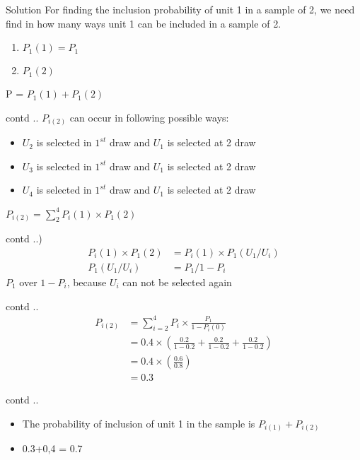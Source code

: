 \documentclass[10pt]{beamer}
\begin{document}
\begin{frame}{Solution}
For finding the inclusion probability of unit 1 in a sample of 2, we need find in how many ways unit 1 can be included in a sample of 2.
\begin{enumerate}
    \item $P_1(1) = P_1$
    \item $P_1(2) $
\end{enumerate}
P = $P_1(1) + P_1(2)$
\end{frame}

\begin{frame}{contd ..}
$P_{i(2)}$ can occur in following possible ways:\\
\begin{itemize}
    \item $U_2$ is selected in $1^{st}$ draw and $U_1$ is selected at 2 draw
    \item $U_3$ is selected in $1^{st}$ draw and $U_1$ is selected at 2 draw
    \item $U_4$ is selected in $1^{st}$ draw and $U_1$ is selected at 2 draw
\end{itemize}
$P_{i(2)} = \sum_2^4 P_i(1) \times P_1(2)$
\end{frame}

\begin{frame}{contd ..)}
\begin{align*}
P_i(1) \times P_1(2) &= P_i(1) \times P_1(U_1/U_i)\\
P_1(U_1/U_i) &= P_1 / 1 -  P_i
\end{align*}
$P_1$ over $1 - P_i$, because $U_i$ can not be selected again\\
\end{frame}

\begin{frame}{contd ..}
\begin{align*}
    P_{i(2)} &= \sum_{i=2}^4 P_i \times \frac{P_1}{1-P_i(0)} \\
    &= 0.4 \times \left (\frac{0.2}{1-0.2} + \frac{0.2}{1-0.2} + \frac{0.2}{1-0.2} \right)\\
    &= 0.4 \times \left (\frac{0.6}{0.8} \right)\\
    &=0.3
\end{align*}
\end{frame}

\begin{frame}{contd ..}
\begin{itemize}
\item The probability of inclusion of unit 1 in the sample is $P_{i(1)}+P_{i(2)}$
\item 0.3+0,4 = 0.7
\end{itemize}
\end{frame}
\end{document}
